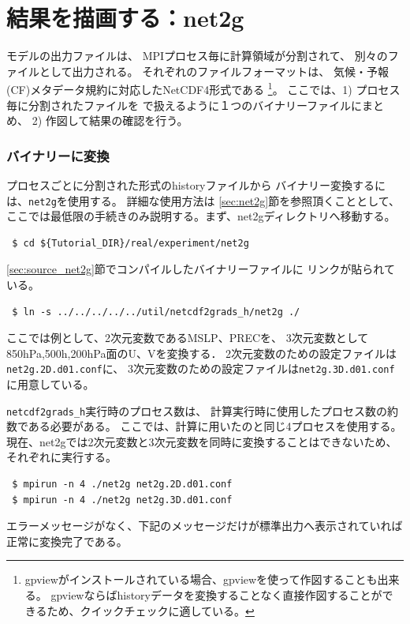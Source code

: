 \section{結果を描画する：net2g} \label{sec:quicklook}

\scalerm モデルの出力ファイルは、
MPIプロセス毎に計算領域が分割されて、
別々のファイルとして出力される。
それぞれのファイルフォーマットは、
気候・予報(CF)メタデータ規約に対応したNetCDF4形式である
\footnote{gpviewがインストールされている場合、gpviewを使って作図することも出来る。
gpviewならばhistoryデータを変換することなく直接作図することができるため、クイックチェックに適している。}。
ここでは、1) プロセス毎に分割された{\netcdf}ファイルを
{\grads}で扱えるように１つのバイナリーファイルにまとめ、
2) 作図して結果の確認を行う。

\subsubsection{{\grads}バイナリーに変換}
プロセスごとに分割された{\netcdf}形式のhistoryファイルから
{\grads}バイナリー変換するには、\verb|net2g|を使用する。
詳細な使用方法は \ref{sec:net2g}節を参照頂くこととして、
ここでは最低限の手続きのみ説明する。まず、net2gディレクトリへ移動する。
\begin{verbatim}
 $ cd ${Tutorial_DIR}/real/experiment/net2g
\end{verbatim}

\ref{sec:source_net2g}節でコンパイルしたバイナリーファイルに
リンクが貼られている。
\begin{verbatim}
 $ ln -s ../../../../../util/netcdf2grads_h/net2g ./
\end{verbatim}
ここでは例として、2次元変数であるMSLP、PRECを、
3次元変数として850hPa,500h,200hPa面のU、Vを変換する．
2次元変数のための設定ファイルは\verb|net2g.2D.d01.conf|に、
3次元変数のための設定ファイルは\verb|net2g.3D.d01.conf|に用意している。

\verb|netcdf2grads_h|実行時のプロセス数は、
計算実行時に使用したプロセス数の約数である必要がある。
ここでは、計算に用いたのと同じ4プロセスを使用する。
現在、net2gでは2次元変数と3次元変数を同時に変換することはできないため、
それぞれに実行する。
\begin{verbatim}
 $ mpirun -n 4 ./net2g net2g.2D.d01.conf
 $ mpirun -n 4 ./net2g net2g.3D.d01.conf
\end{verbatim}
エラーメッセージがなく、下記のメッセージだけが標準出力へ表示されていれば正常に変換完了である。\\

